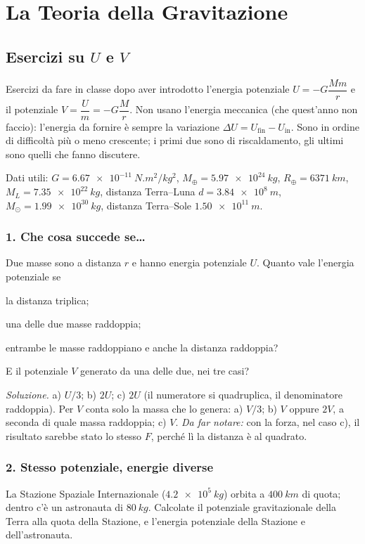 \documentclass[11pt]{report}
\begin{document}
\chapter{La Teoria della Gravitazione}


\section*{Esercizi su $U$ e $V$}

Esercizi da fare in classe dopo aver introdotto l'energia potenziale
$U = -G\dfrac{Mm}{r}$ e il potenziale $V = \dfrac{U}{m} = -G\dfrac{M}{r}$.
Non usano l'energia meccanica (che quest'anno non faccio): l'energia
da fornire è sempre la variazione $\Delta U = U_\text{fin} - U_\text{in}$.
Sono in ordine di difficoltà più o meno crescente; i primi due sono
di riscaldamento, gli ultimi sono quelli che fanno discutere.

Dati utili: $G = \SI{6.67e-11}{N.m^2/kg^2}$, $M_\oplus = \SI{5.97e24}{kg}$,
$R_\oplus = \SI{6371}{km}$, $M_L = \SI{7.35e22}{kg}$, distanza Terra--Luna
$d = \SI{3.84e8}{m}$, $M_\odot = \SI{1.99e30}{kg}$, distanza Terra--Sole
$\SI{1.50e11}{m}$.

\subsection*{1. Che cosa succede se\dots}
Due masse sono a distanza $r$ e hanno energia potenziale $U$. Quanto vale
l'energia potenziale se
\begin{enumerate*}[label=\alph*)]
  \item la distanza triplica;
  \item una delle due masse raddoppia;
  \item entrambe le masse raddoppiano e anche la distanza raddoppia?
\end{enumerate*}
E il potenziale $V$ generato da una delle due, nei tre casi?

\emph{Soluzione.} a) $U/3$; b) $2U$; c) $2U$ (il numeratore si quadruplica,
il denominatore raddoppia). Per $V$ conta solo la massa che lo genera:
a) $V/3$; b) $V$ oppure $2V$, a seconda di quale massa raddoppia; c) $V$.
\emph{Da far notare:} con la forza, nel caso c), il risultato sarebbe stato
lo stesso $F$, perché lì la distanza è al quadrato.

\subsection*{2. Stesso potenziale, energie diverse}
La Stazione Spaziale Internazionale ($\SI{4.2e5}{kg}$) orbita a
$\SI{400}{km}$ di quota; dentro c'è un astronauta di $\SI{80}{kg}$.
Calcolate il potenziale gravitazionale della Terra alla quota della
Stazione, e l'energia potenziale della Stazione e dell'astronauta.
\end{document}
